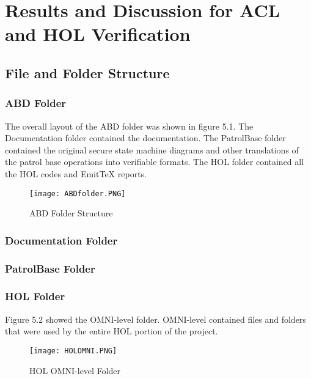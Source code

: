 
\chapter{Results and Discussion for ACL and HOL Verification}
\label{cha:results-disc-acl}

\section{File and Folder Structure}
\label{sec:file-fold-struct}

\subsection{ABD Folder}
\label{sec:abd-folder-1}


The overall layout of the ABD folder was shown in figure 5.1.  The Documentation folder contained
the documentation.  The PatrolBase folder contained the original secure state machine diagrams
and other translations of the patrol base operations into verifiable formats.  The HOL folder
contained all the HOL codes and EmitTeX reports. 
  \begin{figure}[h]
  \centering
  \texttt{[image: ABDfolder.PNG]}
  \caption{ABD Folder Structure}
\end{figure}

\subsection{Documentation Folder}
\label{sec:documentation-folder-1}


\subsection{PatrolBase Folder}
\label{sec:patrolbase-folder-1}


\subsection{HOL Folder}
\label{sec:hol-folder-1}


Figure 5.2 showed the OMNI-level folder.  OMNI-level contained files and folders that were
used by the entire HOL portion of the project. 
\begin{figure}[h]
  \centering
  \texttt{[image: HOLOMNI.PNG]}
  \caption{HOL OMNI-level Folder}
\end{figure}\\

